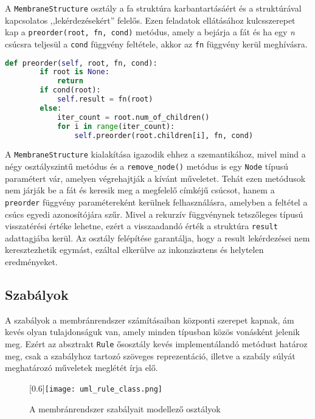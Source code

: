 A \verb|MembraneStructure| osztály a fa struktúra karbantartásáért és a struktúrával kapcsolatos ,,lekérdezésekért'' felelős. Ezen feladatok ellátásához kulcsszerepet kap a \verb|preorder(root, fn, cond)| metódus, amely a bejárja a fát és ha egy \textit{n} csúcsra teljesül a \verb|cond| függvény feltétele, akkor az  \verb|fn| függvény kerül meghívásra.

\begin{lstlisting}[language={Python}]
def preorder(self, root, fn, cond):
        if root is None:
            return
        if cond(root):
            self.result = fn(root)
        else:
            iter_count = root.num_of_children()
            for i in range(iter_count):
                self.preorder(root.children[i], fn, cond)
\end{lstlisting}

A \verb|MembraneStructure| kialakítása igazodik ehhez a szemantikához, mivel mind a négy osztályszintű metódus és a \verb|remove_node()| metódus is egy \verb|Node| típusú paramétert vár, amelyen végrehajtják a kívánt műveletet. Tehát ezen metódusok nem járják be a fát és keresik meg a megfelelő címkéjű csúcsot, hanem a \verb|preorder| függvény paramétereként kerülnek felhasználásra, amelyben a feltétel a csúcs egyedi azonosítójára szűr. Mivel a rekurzív függvénynek tetszőleges típusú visszatérési értéke lehetne, ezért a visszaadandó érték a struktúra \verb|result| adattagjába kerül. Az osztály felépítése garantálja, hogy a result lekérdezései nem keresztezhetik egymást, ezáltal elkerülve az inkonzisztens és helytelen eredményeket.

\subsection{Szabályok}

A szabályok a membránrendszer számításaiban központi szerepet kapnak, ám kevés olyan tulajdonságuk van, amely minden típusban közös vonásként jelenik meg. Ezért az absztrakt \verb|Rule| ősosztály kevés implementálandó metódust határoz meg, csak a szabályhoz tartozó szöveges reprezentáció, illetve a szabály súlyát meghatározó műveletek meglétét írja elő. 


\begin{figure}[H]
\centering
	\scalebox{0.6}[0.6]{\texttt{[image: uml\_rule\_class.png]}}
	\caption{A membránrendszer szabályait modellező osztályok}
	\label{fig:rule_uml}
\end{figure}

